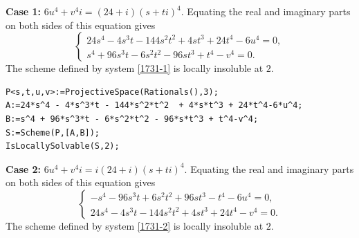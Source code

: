 \documentclass[a4paper,12pt,english,reqno]{amsart}
\begin{document}
{\bf Case 1:} $6u^4+v^4i=(24+i)(s+ti)^4$. Equating the real and imaginary parts on both sides of this equation gives
\begin{equation}\label{1731-1}
\begin{cases}
24s^4 - 4s^3t - 144s^2t^2 + 4st^3 + 24t^4 - 6u^4=0,\\
s^4 + 96s^3t - 6s^2t^2 - 96st^3 + t^4 - v^4=0.
\end{cases}
\end{equation}
The scheme defined by system \eqref{1731-1} is locally insoluble at $2$.


\begin{lstlisting}
P<s,t,u,v>:=ProjectiveSpace(Rationals(),3);
A:=24*s^4 - 4*s^3*t - 144*s^2*t^2  + 4*s*t^3 + 24*t^4-6*u^4;
B:=s^4 + 96*s^3*t - 6*s^2*t^2 - 96*s*t^3 + t^4-v^4;
S:=Scheme(P,[A,B]);
IsLocallySolvable(S,2);
\end{lstlisting}

{\bf Case 2:} $6u^4+v^4i=i(24+i)(s+ti)^4$. Equating the real and imaginary parts on both sides of this equation gives
\begin{equation}\label{1731-2}
\begin{cases}
-s^4 - 96s^3t + 6s^2t^2 + 96st^3 - t^4 - 6u^4=0,\\
24s^4 - 4s^3t - 144s^2t^2 + 4st^3 + 24t^4 - v^4=0.
\end{cases}
\end{equation}
The scheme defined by system \eqref{1731-2} is locally insoluble at $2$.

\end{document}
